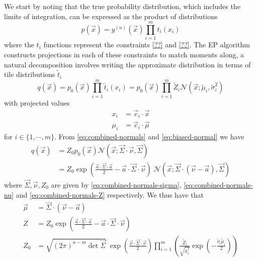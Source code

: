 \documentclass[11pt,twoside]{report}
\begin{document}
We start by noting that the true probability distribution, which includes the limits of integration, can be expressed as the product of distributions
\begin{equation}
  p(\vec{x})
  = y^{(n)}(\vec{x}) \prod_{i=1}^{m} t_i (x_i)
\end{equation}
where the $t_i$ functions represent the constraints \eqref{??} and \eqref{??}.
The EP algorithm constructs projections in each of these constraints to match moments along, a natural decomposition involves writing the approximate distribution in terms of tile distributions $\tilde{t}_i$
\begin{equation}
  q(\vec{x})
  = p_0(\vec{x}) \prod_{i=1}^{m} \tilde{t}_i (x_i)
  = p_0(\vec{x}) \prod_{i=1}^{m} \tilde{Z}_i \mathcal{N}(\vec{x}; \tilde{\mu}_i, \tilde{\sigma}_i^2)
\end{equation}
with projected values
\begin{subequations}
  \begin{align}
    x_i &= \vec{c}_i \cdot \vec{x} \\
    \mu_i &= \vec{c}_i \cdot \vec{\mu}
  \end{align}
\end{subequations}
for $i \in \{1,\cdots,m\}$.
From \eqref{eq:combined-normals} and \eqref{eq:biased-normal} we have
\begin{equation}
  \begin{split}
    q(\vec{x}) &=
    Z_0
    p_0(\vec{x})
    \mathcal{N}(\vec{x}; \vec{\Sigma} \cdot \vec{\nu}, \vec{\Sigma}) \\
    &=
    Z_0
    \exp{\left( \frac{\vec{a} \cdot \vec{\Sigma} \cdot \vec{a}}{2} - \vec{a} \cdot \vec{\Sigma} \cdot{\vec{\nu}} \right)} \;
    \mathcal{N}(\vec{x}; \vec{\Sigma} \cdot (\vec{\nu} - \vec{a}), \vec{\Sigma})
  \end{split}
\end{equation}
where $\vec{\Sigma}, \vec{\nu}, Z_0$ are given by \eqref{eq:combined-normals-sigma}, \eqref{eq:combined-normals-nu} and \eqref{eq:combined-normals-Z} respectively.
We thus have that
\begin{subequations}
  \begin{align}
    \vec{\mu} &= \vec{\Sigma} \cdot (\vec{\nu} - \vec{a})
    \\
    Z &= Z_0
    \exp{\left( \frac{\vec{a} \cdot \vec{\Sigma} \cdot \vec{a}}{2} - \vec{a} \cdot \vec{\Sigma} \cdot \vec{\nu} \right)}
    \\
    Z_0 &=
    \sqrt{ (2\pi)^{n-m} \det{\vec{\Sigma}} }
    \;
    \exp{\left( \frac{\vec{\nu} \cdot \vec{\Sigma} \cdot \vec{\nu}}{2} \right)}
    \prod_{i=1}^m
    \left(
    \frac{\tilde{Z}_i}{\sqrt{ \tilde{\sigma}_i^2 }}
    \exp{\left(-\frac{\tilde{\nu}_i \tilde{\mu}_i}{2}\right)}
    \right)
  \end{align}
\end{subequations}
\end{document}
